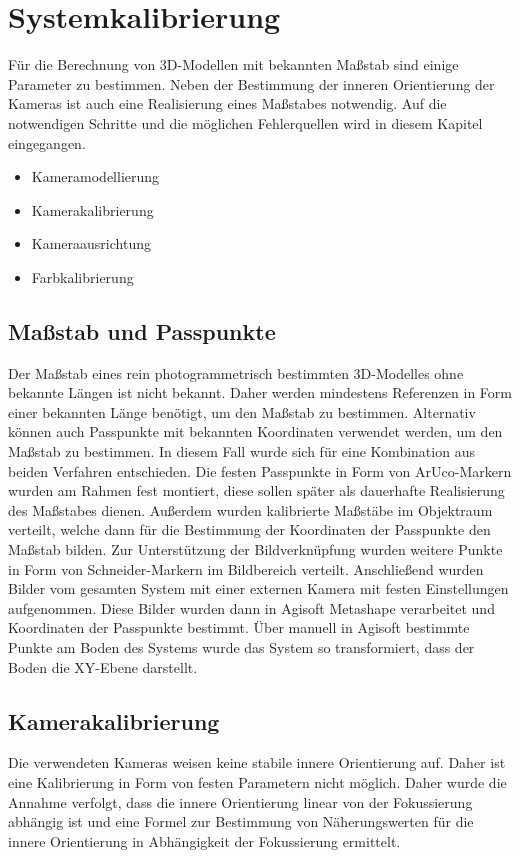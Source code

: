 \documentclass[./00PhotoBox.tex]{subfiles}
\begin{document}
\chapter{Systemkalibrierung}

Für die Berechnung von 3D-Modellen mit bekannten Maßstab sind einige Parameter zu bestimmen. Neben der Bestimmung der inneren Orientierung der Kameras ist auch eine Realisierung eines Maßstabes notwendig. Auf die notwendigen Schritte und die möglichen Fehlerquellen wird in diesem Kapitel eingegangen.

\begin{itemize}
    \item Kameramodellierung
    \item Kamerakalibrierung
    \item Kameraausrichtung
    \item Farbkalibrierung
\end{itemize}

\section{Maßstab und Passpunkte}
\label{sec:passpunkte}
Der Maßstab eines rein photogrammetrisch bestimmten 3D-Modelles ohne bekannte Längen ist nicht bekannt. Daher werden mindestens Referenzen in Form einer bekannten Länge benötigt, um den Maßstab zu bestimmen. Alternativ können auch Passpunkte mit bekannten Koordinaten verwendet werden, um den Maßstab zu bestimmen. In diesem Fall wurde sich für eine Kombination aus beiden Verfahren entschieden. Die festen Passpunkte in Form von ArUco-Markern wurden am Rahmen fest montiert, diese sollen später als dauerhafte Realisierung des Maßstabes dienen. Außerdem wurden kalibrierte Maßstäbe im Objektraum verteilt, welche dann für die Bestimmung der Koordinaten der Passpunkte den Maßstab bilden. Zur Unterstützung der Bildverknüpfung wurden weitere Punkte in Form von Schneider-Markern im Bildbereich verteilt. Anschließend wurden Bilder vom gesamten System mit  einer externen Kamera mit festen Einstellungen aufgenommen. Diese Bilder wurden dann in Agisoft Metashape verarbeitet und Koordinaten der Passpunkte bestimmt. Über manuell in Agisoft bestimmte Punkte am Boden des Systems wurde das System so transformiert, dass der Boden die XY-Ebene darstellt.

\section{Kamerakalibrierung}
Die verwendeten Kameras weisen keine stabile innere Orientierung auf. Daher ist eine Kalibrierung in Form von festen Parametern nicht möglich. Daher wurde die Annahme verfolgt, dass die innere Orientierung linear von der Fokussierung abhängig ist und eine Formel zur Bestimmung von Näherungswerten für die innere Orientierung in Abhängigkeit der Fokussierung ermittelt.
\end{document}
